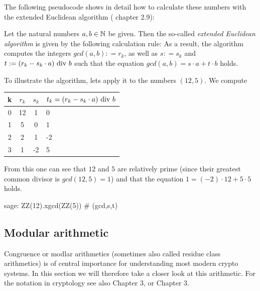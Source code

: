 The following pseudocode shows in detail how to calculate these numbers with the extended Euclidean algorithm (\cite{JB} chapter 2.9):




\begin{definition}
\label{theorem: ext_Euclid}
Let the natural numbers $ a, b \in \mathbb{N} $ be given. Then the so-called \textit{extended Euclidean algorithm} is given by the following calculation rule:
As a result, the algorithm computes the integers $ gcd (a, b): = r_k $, as well as $ s: = s_k $ and $ t: = (r_k-s_k \cdot a) \text{ div } b $ such that the equation
$ gcd (a, b) = s \cdot a + t \cdot b $ holds.
\end{definition}
\begin{example} To illustrate the algorithm, lets apply it to the numbers $ (12,5) $. We compute
\begin{center}
  \begin{tabular}{c | c c l}
    k & $ r_k $ & $ s_k $ & $ t_k = (r_k-s_k \cdot a) \text{ div } b $ \\\hline
    0 & 12 & 1 & 0 \\
    1 & 5 & 0 & 1 \\
    2 & 2 & 1 & -2 \\
    3 & 1 & -2 & 5 \\
  \end{tabular}
\end{center}
From this one can see that $ 12 $ and $ 5 $ are relatively prime (since their greatest common divisor is $ gcd (12, 5) = 1 $) and that the equation $ 1 = (-2) \cdot 12 + 5 \cdot 5 $ holds.
\end{example}

\begin{sagecommandline}
sage: ZZ(12).xgcd(ZZ(5)) # (gcd,s,t)
\end{sagecommandline}

\subsection{Modular arithmetic}
Congruence or modlar arithmetics (sometimes also called residue class arithmetics) is of central importance for understanding most modern crypto systems. In this section we will therefore take a closer look at this arithmetic. For the notation in cryptology see also \cite{JB} Chapter 3, or \cite{AL} Chapter 3.

